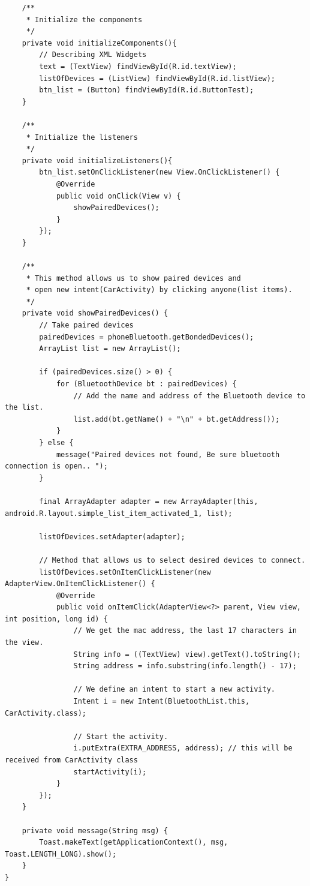 \documentclass[11pt]{article}
\begin{document}
\begin{lstlisting}
    /**
     * Initialize the components
     */
    private void initializeComponents(){
        // Describing XML Widgets
        text = (TextView) findViewById(R.id.textView);
        listOfDevices = (ListView) findViewById(R.id.listView);
        btn_list = (Button) findViewById(R.id.ButtonTest);
    }

    /**
     * Initialize the listeners
     */
    private void initializeListeners(){
        btn_list.setOnClickListener(new View.OnClickListener() {
            @Override
            public void onClick(View v) {
                showPairedDevices();
            }
        });
    }

    /**
     * This method allows us to show paired devices and
     * open new intent(CarActivity) by clicking anyone(list items).
     */
    private void showPairedDevices() {
        // Take paired devices
        pairedDevices = phoneBluetooth.getBondedDevices();
        ArrayList list = new ArrayList();

        if (pairedDevices.size() > 0) {
            for (BluetoothDevice bt : pairedDevices) {
                // Add the name and address of the Bluetooth device to the list.
                list.add(bt.getName() + "\n" + bt.getAddress());
            }
        } else {
            message("Paired devices not found, Be sure bluetooth connection is open.. ");
        }

        final ArrayAdapter adapter = new ArrayAdapter(this, android.R.layout.simple_list_item_activated_1, list);

        listOfDevices.setAdapter(adapter);

        // Method that allows us to select desired devices to connect.
        listOfDevices.setOnItemClickListener(new AdapterView.OnItemClickListener() {
            @Override
            public void onItemClick(AdapterView<?> parent, View view, int position, long id) {
                // We get the mac address, the last 17 characters in the view.
                String info = ((TextView) view).getText().toString();
                String address = info.substring(info.length() - 17);

                // We define an intent to start a new activity.
                Intent i = new Intent(BluetoothList.this, CarActivity.class);

                // Start the activity.
                i.putExtra(EXTRA_ADDRESS, address); // this will be received from CarActivity class
                startActivity(i);
            }
        });
    }

    private void message(String msg) {
        Toast.makeText(getApplicationContext(), msg, Toast.LENGTH_LONG).show();
    }
}
\end{lstlisting}
\end{document}
